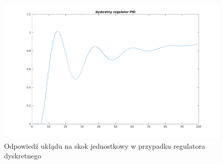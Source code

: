 \documentclass[a4paper, 11pt]{article}
\begin{document}
\begin{figure}[htp]
\centering
\includegraphics[scale=0.60]{2_2.png}
\caption{Odpowiedź ukłądu na skok jednostkowy w przypadku regulatora dyskretnego}
\label{}
\end{figure}
\end{document}
